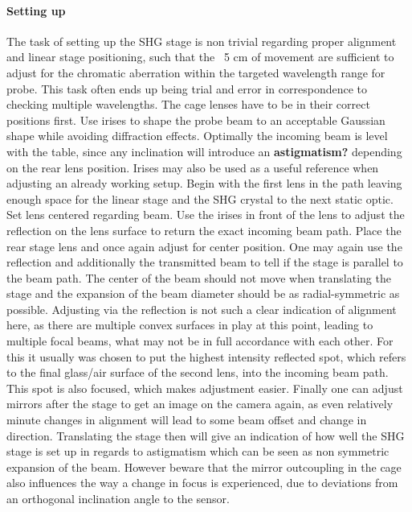 \documentclass[twoside,openright]{scrreprt}
\begin{document}
\paragraph{Setting up}
The task of setting up the SHG stage is non trivial regarding proper alignment and linear stage positioning, such that the ~5 cm of movement are sufficient to adjust for the chromatic aberration within the targeted wavelength range for probe. This task often ends up being trial and error in correspondence to checking multiple wavelengths. The cage lenses have to be in their correct positions first.\newline
Use irises to shape the probe beam to an acceptable Gaussian shape while avoiding diffraction effects. Optimally the incoming beam is level with the table, since any inclination will introduce an \textbf{astigmatism?} depending on the rear lens position. Irises may also be used as a useful reference when adjusting an already working setup.\newline
Begin with the first lens in the path leaving enough space for the linear stage and the SHG crystal to the next static optic. Set lens centered regarding beam. Use the irises in front of the lens to adjust the reflection on the lens surface to return the exact incoming beam path.\newline
Place the rear stage lens and once again adjust for center position. One may again use the reflection and additionally the transmitted beam to tell if the stage is parallel to the beam path. The center of the beam should not move when translating the stage and the expansion of the beam diameter should be as radial-symmetric as possible. Adjusting via the reflection is not such a clear indication of alignment here, as there are multiple convex surfaces in play at this point, leading to multiple focal beams, what may not be in full accordance with each other. For this it usually was chosen to put the highest intensity reflected spot, which refers to the final glass/air surface of the second lens, into the incoming beam path. This spot is also focused, which makes adjustment easier.\newline
Finally one can adjust mirrors after the stage to get an image on the camera again, as even relatively minute changes in alignment will lead to some beam offset and change in direction. Translating the stage then will give an indication of how well the SHG stage is set up in regards to astigmatism which can be seen as non symmetric expansion of the beam. However beware that the mirror outcoupling in the cage also influences the way a change in focus is experienced, due to deviations from an orthogonal inclination angle to the sensor.
\end{document}
